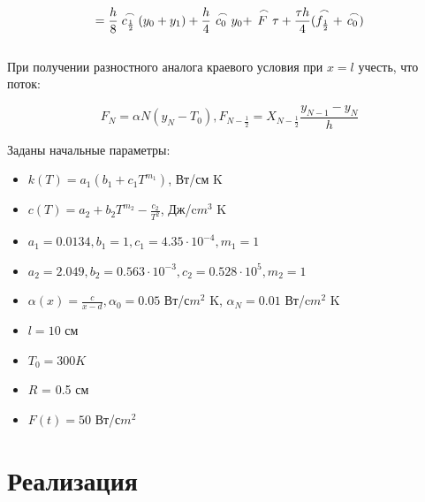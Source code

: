 \documentclass[a4paper,oneside,12pt]{extreport}
\begin{document}
\begin{equation}
	= \frac{h}{8} \buildrel\,\,\frown\over{c_{\frac{1}{2}}} (y_{0} + y_{1}) + \frac{h}{4} \buildrel\,\,\frown\over{c_{0}} y_{0} + \buildrel\,\,\frown\over{F}\tau + \frac{\tau h}{4} (\buildrel\,\,\frown\over{f_{\frac{1}{2}}} + \buildrel\,\,\frown\over{c_{0}})
\end{equation}\\

При получении разностного аналога краевого условия при $x = l$ учесть, что поток:

\begin{equation}
	F_{N} = \alpha{N}(y_{N} - T_{0}), F_{N - \frac{1}{2}} = X_{N - \frac{1}{2}} \frac{y_{N - 1} - y_{N}}{h}
\end{equation}

Заданы начальные параметры:\\

\begin{itemize}
	\item $k(T) = a_{1}(b_{1} + c_{1}T^{m_{1}})$, Вт/см K
	\item $c(T) = a_{2} + b_{2} T^{m_{2}} - \frac{c_{2}}{T^2}$, Дж/c$m^3$ K
	\item $a_{1} = 0.0134, b_{1} = 1, c_{1} = 4.35 \cdot 10^{-4}, m_{1} = 1$
	\item $a_{2} = 2.049, b_{2} = 0.563 \cdot 10^{-3}, c_{2} = 0.528 \cdot 10^{5}, m_{2} = 1$
	\item $\alpha(x) = \frac{c}{x - d}, \alpha_{0} = 0.05$ Вт/с$m^2$ K, $\alpha_{N} = 0.01$ Вт/c$m^2$ K
	\item $l = 10$ см
	\item $T_{0} = 300K$
	\item $R$ = 0.5 см
	\item $F(t) = 50$ Вт/с$m^2$
\end{itemize}


\newpage 
\section{Реализация}
\end{document}
